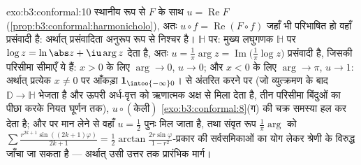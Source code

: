 \begin{solution}{exo:b3:conformal:10}
स्थानीय रूप से  $F$ के साथ $u = \operatorname{Re}F$ (\cref{prop:b3:conformal:harmonicholo}), अतः $u\circ f =
\operatorname{Re}(F\circ f)$
जहाँ भी परिभाषित हो वहाँ प्रसंवादी है: अर्थात् प्रसंवादिता अनुरूप
रूप से निश्चर है। $\mathbb H$ पर: मुख्य लघुगणक $\mathbb H$ पर  $\log z = \ln\abs z + \iu\arg z$
देता है, अतः $u = \frac1\pi\arg z =
\operatorname{Im}\bigl(\frac1\pi\log z\bigr)$ प्रसंवादी है, जिसकी परिसीमा सीमाएँ ये हैं: $x > 0$
के लिए $\arg \to 0$, $u \to 0$; और $x < 0$ के लिए $\arg \to \pi$, $u \to 1$: अर्थात् प्रत्येक
$x \neq 0$ पर आँकड़ा $\mathbf
1_{\intoo{-\infty}0}$।  से अंतरित करने पर (जो व्युत्क्रमण
के बाद $\mathbb D \to \mathbb H$ भेजता है और ऊपरी अर्ध-वृत्त को ऋणात्मक अक्ष से मिला
देता है, तीन परिसीमा बिंदुओं का पीछा करके नियत घूर्णन तक), $u\circ(\text{केली})$
\cref{exo:b3:conformal:8}(ग) की चक्र समस्या हल कर देता है; और  पर मान लेने से वहाँ
$u = \frac12$ पुनः मिल जाता है, तथा संवृत रूप $\frac1\pi\arg$ को $\sum\frac{r^{2k+1}\sin((2k+1)\varphi)}{2k+1} =
\frac12\arctan\frac{2r\sin\varphi}{1 - r^2}$-प्रकार की
सर्वसमिकाओं का योग लेकर श्रेणी के विरुद्ध जाँचा जा सकता है --- अर्थात्
उसी उत्तर तक प्रारंभिक मार्ग।
\end{solution}

